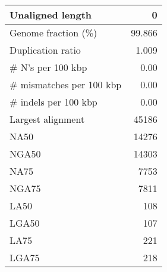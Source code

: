\documentclass[12pt,a4paper]{article}
\begin{document}
\begin{table}[ht]
\begin{center}
\begin{tabular}{|l*{1}{|r}|}
Unaligned length & 0 \\ \hline
Genome fraction (\%) & 99.866 \\ \hline
Duplication ratio & 1.009 \\ \hline
\# N's per 100 kbp & 0.00 \\ \hline
\# mismatches per 100 kbp & 0.00 \\ \hline
\# indels per 100 kbp & 0.00 \\ \hline
Largest alignment & 45186 \\ \hline
NA50 & 14276 \\ \hline
NGA50 & 14303 \\ \hline
NA75 & 7753 \\ \hline
NGA75 & 7811 \\ \hline
LA50 & 108 \\ \hline
LGA50 & 107 \\ \hline
LA75 & 221 \\ \hline
LGA75 & 218 \\ \hline
\end{tabular}
\end{center}
\end{table}
\end{document}

